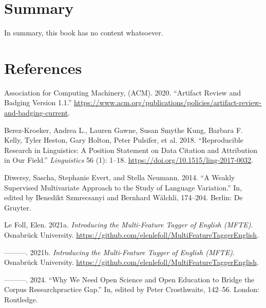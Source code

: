 \documentclass[
  letterpaper,
  DIV=11,
  numbers=noendperiod]{scrreprt}
\newlength{\cslhangindent}
\newenvironment{CSLReferences}[2] %
 {\begin{list}{}{%
  \setlength{\itemindent}{0pt}
  \setlength{\leftmargin}{0pt}
  \setlength{\parsep}{0pt}
  \ifodd #1
   \setlength{\leftmargin}{\cslhangindent}
   \setlength{\itemindent}{-1\cslhangindent}
  \fi
  \setlength{\itemsep}{#2\baselineskip}}}
 {\end{list}}
\begin{document}

\chapter{Summary}\label{summary}

In summary, this book has no content whatsoever.


\chapter*{References}\label{references}


\label{refs}
\begin{CSLReferences}{1}{0}
Association for Computing Machinery, (ACM). 2020. {``Artifact Review and
Badging Version 1.1.''}
\url{https://www.acm.org/publications/policies/artifact-review-and-badging-current}.

Berez-Kroeker, Andrea L., Lauren Gawne, Susan Smythe Kung, Barbara F.
Kelly, Tyler Heston, Gary Holton, Peter Pulsifer, et al. 2018.
{``Reproducible Research in Linguistics: A Position Statement on Data
Citation and Attribution in Our Field.''} \emph{Linguistics} 56 (1):
1--18. \url{https://doi.org/10.1515/ling-2017-0032}.

Diwersy, Sascha, Stephanie Evert, and Stella Neumann. 2014. {``A Weakly
Supervised Multivariate Approach to the Study of Language Variation.''}
In, edited by Benedikt Szmrecsanyi and Bernhard Wälchli, 174--204.
Berlin: De Gruyter.

Le Foll, Elen. 2021a. \emph{Introducing the Multi-Feature Tagger of
English (MFTE)}. Osnabrück University.
\url{https://github.com/elenlefoll/MultiFeatureTaggerEnglish}.

---------. 2021b. \emph{Introducing the Multi-Feature Tagger of English
(MFTE)}. Osnabrück University.
\url{https://github.com/elenlefoll/MultiFeatureTaggerEnglish}.

---------. 2024. {``Why We Need Open Science and Open Education to
Bridge the Corpus Research{\textendash}practice Gap.''} In, edited by
Peter Crosthwaite, 142--56. London: Routledge.


\end{CSLReferences}
\end{document}
